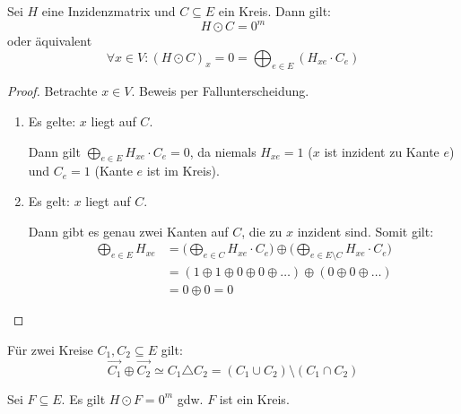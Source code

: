 \begin{proposition}
    Sei $ H $ eine Inzidenzmatrix und $ C \subseteq E $ ein Kreis.
    Dann gilt:
    \begin{equation*}
        H \odot C = 0^m
    \end{equation*}
    oder äquivalent
    \begin{equation*}
        \forall x \in V: (H \odot C)_x = 0 = \bigoplus_{e \in E} (H_{xe} \cdot C_e)
    \end{equation*}
\end{proposition}

\begin{proof}
    Betrachte $ x \in V $.
    Beweis per Fallunterscheidung.
    \begin{enumerate}
        \item Es gelte: $ x $ liegt auf $ C $.

        Dann gilt $ \bigoplus_{e \in E} H_{xe} \cdot C_e = 0 $, da niemals $ H_{xe} = 1 $ ($ x $ ist inzident zu Kante $ e $) und $ C_e = 1 $ (Kante $ e $ ist im Kreis).

        \item Es gelt: $ x $ liegt auf $ C $.

        Dann gibt es genau zwei Kanten auf $ C $, die zu $ x $ inzident sind.
        Somit gilt:
        \begin{align*}
            \bigoplus_{e \in E} H_{xe} &= \big(\bigoplus_{e \in C} H_{xe} \cdot C_e\big) \oplus \big(\bigoplus_{e \in E \setminus C} H_{xe} \cdot C_e\big) \\
            &= (1 \oplus 1 \oplus 0 \oplus 0 \oplus \dots) \oplus (0 \oplus 0 \oplus \dots) \\
            &= 0 \oplus 0 = 0
        \end{align*}
    \end{enumerate}
\end{proof}

\begin{proposition}
    \label{prp:circle-add}
    Für zwei Kreise $ C_1, C_2 \subseteq E $ gilt:
    \begin{equation*}
        \vec{C_1} \oplus \vec{C_2} \simeq C_1 \triangle C_2 = (C_1 \cup C_2) \setminus (C_1 \cap C_2)
    \end{equation*}
\end{proposition}

\begin{proposition}
    \label{prp:circle-mult}
    Sei $ F \subseteq E $.
    Es gilt $ H \odot F = 0^m $ gdw. $ F $ ist ein Kreis.
\end{proposition}

